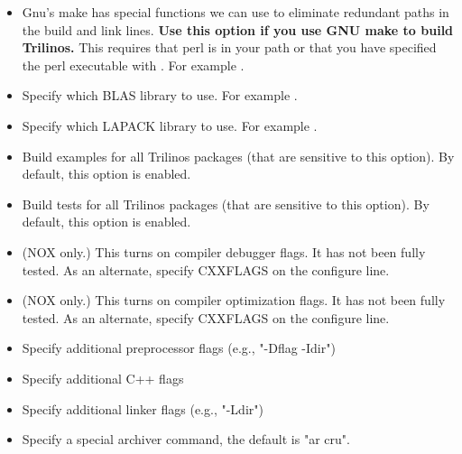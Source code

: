 \begin{itemize}

\item {}

Gnu's make has special functions we can use to eliminate redundant
paths in the build and link lines. {\bf Use this option if you use 
GNU make to build Trilinos.}  This requires that perl is in your path
or that you have specified the perl executable with 
.  For example 
.

\item {}

Specify which BLAS library to use.  For example \newline 
{}.

\item {}

Specify which LAPACK library to use.  For example \newline
{}. 

\item {}

Build examples for all Trilinos packages (that are sensitive to 
this option).  By default, this option is enabled.

\item {} 

Build tests for all Trilinos packages (that are sensitive to this option).  
By default, this option is enabled.

\item {} 

(NOX only.)  This turns on compiler debugger flags. It has 
not been fully tested. As an alternate, specify CXXFLAGS on the 
                 configure line.

\item {}

(NOX only.)  This turns on compiler optimization flags. It 
has not been fully tested. As an alternate, specify CXXFLAGS on the 
                 configure line. 

\item {}

Specify additional preprocessor flags (e.g., "-Dflag -Idir") 

\item {}

Specify additional C++ flags 

\item {}

Specify additional linker flags (e.g., "-Ldir") 

\item {}

Specify a special archiver command, the default is "ar cru". 
\end{itemize}

